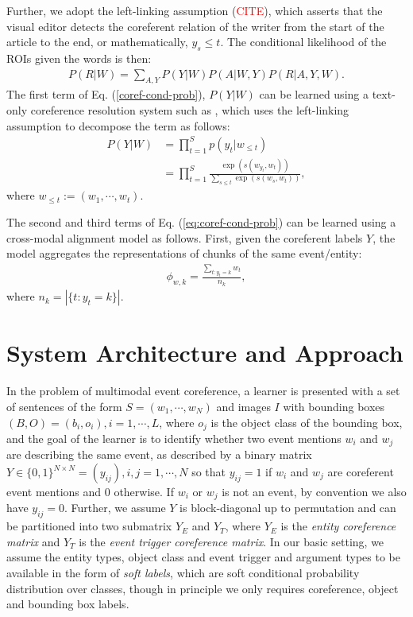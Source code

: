 \documentclass[11pt,a4paper]{article}
\begin{document}
 Further, we adopt the left-linking assumption (\textcolor{red}{CITE}), which asserts that the visual editor detects the coreferent relation of the writer from the start of the article to the end, or mathematically, $y_s \leq t$. The conditional likelihood of the ROIs given the words is then:
 \begin{align}\label{coref-cond-prob}
     P(R|W) = \sum_{A, Y} P(Y|W) P(A|W, Y) P(R|A, Y, W). 
 \end{align}
The first term of Eq. (\ref{coref-cond-prob}), $P(Y|W)$ can be learned using a text-only coreference resolution system such as \cite{Lee2017-neural-coref}, which uses the left-linking assumption to decompose the term as follows:
\begin{align}\label{left-link-coref-prob}
    P(Y|W) &= \prod_{t=1}^S p(y_t|w_{\leq t})\\
           &= \prod_{t=1}^S \frac{\exp(s(w_{y_t}, w_t))}{\sum_{s\leq t}\exp(s(w_{s}, w_t))},
\end{align}
where $w_{\leq t} := (w_1, \cdots, w_t)$. 

The second and third terms of Eq. (\ref{eq:coref-cond-prob}) can be learned using a cross-modal alignment model as follows. First, given the coreferent labels $Y$, the model aggregates the representations of chunks of the same event/entity:
\begin{align}
    \phi_{w, k} = \frac{\sum_{t:y_t=k} w_{t}}{n_k}, 
\end{align}
where $n_k = |\{t:y_t=k\}|$.

\section{System Architecture and Approach}
In the problem of multimodal event coreference, a learner is presented with a set of sentences of the form $S = (w_1, \cdots, w_N)$ and images $I$ with bounding boxes $(B, O) = (b_i, o_i), i=1, \cdots, L$, where $o_j$ is the object class of the bounding box, and the goal of the learner is to identify whether two event mentions $w_i$ and $w_j$ are describing the same event, as described by a binary matrix $Y \in \{0, 1\}^{N \times N} = (y_{ij}), i,j=1,\cdots,N$ so that $y_{ij}=1$ if $w_i$ and $w_j$ are coreferent event mentions and 0 otherwise. If $w_i$ or $w_j$ is not an event, by convention we also have $y_{ij}=0$. Further, we assume $Y$ is block-diagonal up to permutation and can be partitioned into two submatrix $Y_E$ and $Y_T$, where $Y_E$ is the \textit{entity coreference matrix} and $Y_T$ is the \textit{event trigger coreference matrix}. In our basic setting, we assume the entity types, object class and event trigger and argument types to be available in the form of \textit{soft labels}, which are soft conditional probability distribution over classes, though in principle we only requires coreference, object and bounding box labels.
\end{document}
